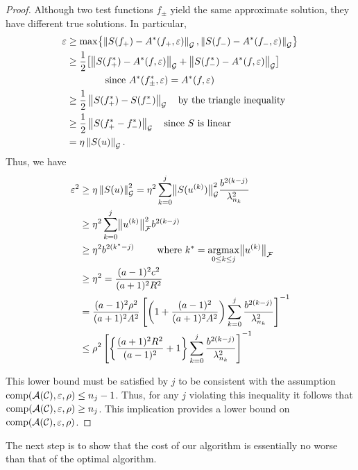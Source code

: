 \documentclass[graybox,footinfo]{svmult}
\newcommand{\DHJRnorm}[2][{}]{\ensuremath{\left \lVert #2 \right \rVert}_{#1}}
\newcommand{\DHJRbignorm}[2][{}]{\ensuremath{\bigl \lVert #2 \bigr \rVert}_{#1}}
\begin{document}
\begin{proof}
Although two test functions $f_\pm$ yield the same approximate solution, they have different true solutions.  In particular,
\begin{align*}
\varepsilon &\ge \max \bigl\{\DHJRnorm[\calG]{S(f_+) - A^*(f_+,\varepsilon)}, \DHJRnorm[\calG]{S(f_-) - A^*(f_-,\varepsilon)} \bigr\} \\
&\ge \frac 12 \bigl[\DHJRnorm[\calG]{S(f^*_+) - A^*(f,\varepsilon)} + \DHJRnorm[\calG]{S(f^*_-) - A^*(f,\varepsilon)}  \bigr] \\
&\qquad \qquad \text{since } A^*(f^*_\pm,\varepsilon) = A^*(f,\varepsilon) \\
&\ge \frac 12 \DHJRnorm[\calG]{S(f^*_+) - S(f^*_-)} \quad \text{by the triangle inequality}\\
&\ge \frac 12 \DHJRnorm[\calG]{S(f^*_+ - f^*_-)} \quad \text{since $S$ is linear}\\
&= \eta \DHJRnorm[\calG]{S(u)}.
\end{align*}
Thus, we have
\begin{align*}
\varepsilon^2  & \ge \eta \DHJRnorm[\calG]{S(u)}^2= 
\eta^2 \sum_{k=0}^{j} \DHJRbignorm[\calG]{S(u^{(k)})}^2  \frac{b^{2(k-j)}}{\lambda_{n_k}^2}\\
& \ge \eta^2 
\sum_{k=0}^{j} \DHJRbignorm[\calF]{u^{(k)}}^2 
b^{2(k-j)}\\
& \ge  \eta^2 b^{2(k^{*}-j)} \qquad \text{ where } k^* = \argmax_{0 \le k \le j} \DHJRbignorm[\calF]{u^{(k)}} \\
& \ge \eta^2 = \frac{(a-1)^2c^2}{(a+1)^2R^2} \\
&
=\frac{(a-1)^2 \rho^2}{(a+1)^2A^2}\left[\left(1+\frac{(a-1)^2}{(a+1)^{2} A^2 }\right)\sum_{k=0}^j \frac{b^{2(k-j)}}{\lambda_{n_{k}}^2}\right]^{-1} \\
& \le  \rho^2 \left[\left\{\frac{(a+1)^{2} R^2 }{(a-1)^2} + 1\right\}\sum_{k=0}^j \frac{b^{2(k-j)}}{\lambda_{n_{k}}^2}\right]^{-1} 
\end{align*}

This lower bound must be satisfied by $j$ to be consistent with the assumption $\textup{comp}({\mathcal{A}}({\mathcal{C}}),\varepsilon,\rho) \le n_j - 1$.  Thus, for any $j$ violating this inequality it follows that $\textup{comp}({\mathcal{A}}({\mathcal{C}}),\varepsilon,\rho) \ge n_j$.  This implication provides a lower bound on $\textup{comp}({\mathcal{A}}({\mathcal{C}}),\varepsilon,\rho)$.
\end{proof}

The next step is to show that the cost of our algorithm is essentially no worse than that of the optimal algorithm.
\end{document}
